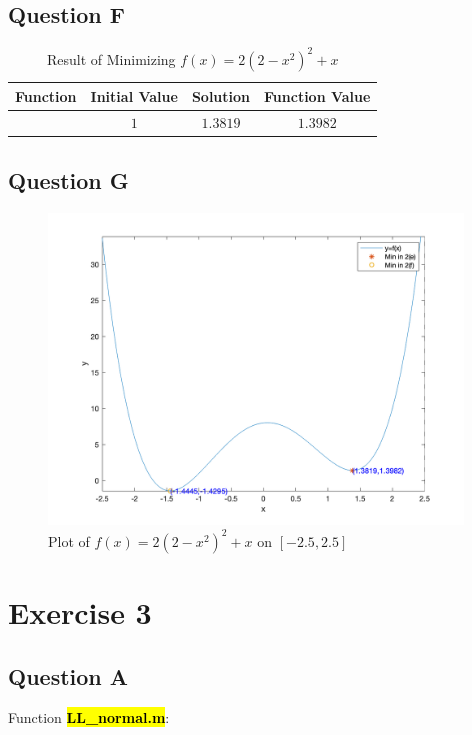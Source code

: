 \documentclass{report}
\begin{document}
\subsection*{Question F}

\begin{table}[H]
	\begin{center}
		\caption{Result of Minimizing $f(x)=2(2-x^2)^2+x$}
		\label{tab:table4}
		\vspace{2mm}
		\begin{tabular}{c|c|c|c} 
			
			\textbf{Function} & \textbf{Initial Value}& \textbf{Solution} & \textbf{Function Value}\\
			\hline
			
			\text{fminunc} &  $1$ & 	$1.3819$ & 	$1.3982$
		\end{tabular}
	\end{center}
\end{table}

\subsection*{Question G}

\begin{figure}[H]
	\centering
	\includegraphics[width = 11cm]{fig/2g}
	\caption{Plot of $f(x)=2(2-x^2)^2+x$ on $[-2.5,2.5]$  } 
\end{figure}




\section*{Exercise 3}
\subsection*{Question A}
Function \hl{\textbf{LL\_normal.m}}:

\end{document}

